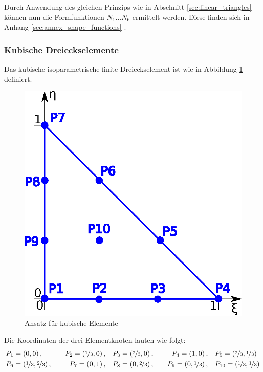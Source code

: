 Durch Anwendung des gleichen Prinzips wie in Abschnitt \ref{sec:linear_triangles} können nun die Formfunktionen $N_1 \text{...} N_6$ ermittelt werden. Diese finden sich in Anhang \ref{sec:annex_shape_functions} .





\subsubsection{Kubische Dreieckselemente}

Das kubische isoparametrische finite Dreieckselement ist wie in Abbildung \ref{fig:cubic_element} definiert.

\begin{figure}
	\begin{center}
		\includegraphics[scale=0.65]{pics/cubic_element.eps}
	\end{center}
	\caption{Ansatz für kubische Elemente}
	\label{fig:cubic_element}
\end{figure}

Die Koordinaten der drei Elementknoten lauten wie folgt:
\begin{align}
&P_1 = \left(0, 0 \right), \quad &P_2 = \left(\nicefrac{1}{3}, 0 \right), \quad &P_3 = \left(\nicefrac{2}{3}, 0 \right), \quad &P_4 = \left(1, 0 \right), \quad &P_5 = \left(\nicefrac{2}{3}, \nicefrac{1}{3} \right)\\
&P_6 = \left(\nicefrac{1}{3}, \nicefrac{2}{3} \right), \quad &P_7 = \left(0, 1 \right), \quad &P_8 = \left(0, \nicefrac{2}{3} \right), \quad &P_9 = \left(0, \nicefrac{1}{3} \right), \quad &P_{10} = \left(\nicefrac{1}{3}, \nicefrac{1}{3} \right) \nonumber
\end{align}

